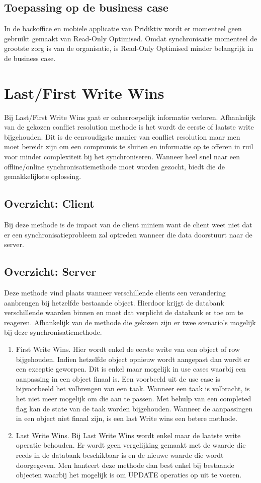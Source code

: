 \subsection{Toepassing op de business case}
In de backoffice en mobiele applicatie van Pridiktiv wordt er momenteel geen gebruikt gemaakt van Read-Only Optimised. Omdat synchronisatie momenteel de grootste zorg is van de organisatie, is Read-Only Optimised minder belangrijk in de business case.
\section{Last/First Write Wins}
Bij Last/First Write Wins gaat er onherroepelijk informatie verloren. Afhankelijk van de gekozen conflict resolution methode is het wordt de eerste of laatste write bijgehouden. Dit is de eenvoudigste manier van conflict resolution maar men moet bereidt zijn om een compromis te sluiten en informatie op te offeren in ruil voor minder complexiteit bij het synchroniseren. Wanneer heel snel naar een offline/online synchronisatiemethode moet worden gezocht, biedt die de gemakkelijkste oplossing.
\subsection{Overzicht: Client}
Bij deze methode is de impact van de client miniem want de client weet niet dat er een synchronisatieprobleem zal optreden wanneer die data doorstuurt naar de server.
\subsection{Overzicht: Server}
Deze methode vind plaats wanneer verschillende clients een verandering aanbrengen bij hetzelfde bestaande object. Hierdoor krijgt de databank verschillende waarden binnen en moet dat verplicht de databank er toe om te reageren. Afhankelijk van de methode die gekozen zijn er twee scenario's mogelijk bij deze synchronisatiemethode.
\begin{enumerate}
\item First Write Wins. Hier wordt enkel de eerste write van een object of row bijgehouden. Indien hetzelfde object opnieuw wordt aangepast dan wordt er een exceptie geworpen. Dit is enkel maar mogelijk in use cases waarbij een aanpassing in een object finaal is. Een voorbeeld uit de use case is bijvoorbeeld het volbrengen van een taak. Wanneer een taak is volbracht, is het niet meer mogelijk om die aan te passen. Met behulp van een completed flag kan de state van de taak worden bijgehouden. Wanneer de aanpassingen in een object niet finaal zijn, is een last Write wins een betere methode.
\item Last Write Wins. Bij Last Write Wins wordt enkel maar de laatste write operatie behouden. Er wordt geen vergelijking gemaakt met de waarde die reeds in de databank beschikbaar is en de nieuwe waarde die wordt doorgegeven. Men hanteert deze methode dan best enkel bij bestaande objecten waarbij het mogelijk is om UPDATE operaties op uit te voeren.
\end{enumerate}
